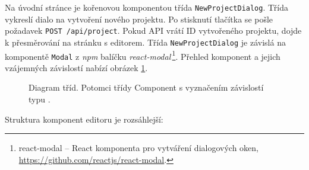Na úvodní stránce je kořenovou komponentou třída \texttt{NewProjectDialog}. Třída vykreslí dialo na vytvoření nového projektu. Po stisknutí tlačítka  se pošle požadavek \texttt{POST /api/project}. Pokud API vrátí ID vytvořeného projektu, dojde k přesměrování na stránku s editorem. Třída \texttt{NewProjectDialog} je závislá na komponentě \texttt{Modal} z \textit{npm} balíčku \textit{react-modal}\,\footnote{react-modal -- React komponenta pro vytváření dialogových oken, \url{https://github.com/reactjs/react-modal}.}. Přehled komponent a jejich vzájemných závislostí nabízí obrázek \ref{img:react}.
\begin{figure}[h]
	\centering
	\caption{Diagram tříd. Potomci třídy Component s vyznačením závislostí typu .}\label{img:react}
\end{figure}

Struktura komponent editoru je rozsáhlejší:

